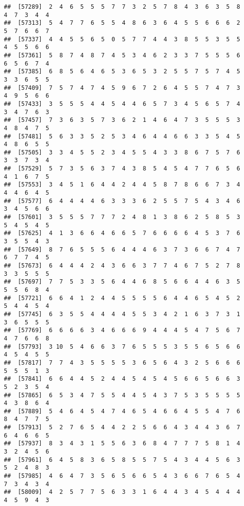 \documentclass[
]{book}
\begin{document}
\begin{verbatim}
##  [57289]  2  4  6  5  5  5  7  7  3  2  5  7  8  4  3  6  3  5  8  4  7  3  4  4
##  [57313]  5  4  7  7  6  5  5  4  8  6  3  6  4  5  5  6  6  6  2  5  7  6  6  7
##  [57337]  4  4  5  5  6  5  0  5  7  7  4  4  3  8  5  5  3  5  5  4  5  5  6  6
##  [57361]  5  8  7  4  8  7  4  5  3  4  6  2  3  3  7  5  5  5  6  6  5  6  7  4
##  [57385]  6  8  5  6  4  6  5  3  6  5  3  2  5  5  7  5  7  4  5  3  3  6  5  5
##  [57409]  7  5  7  4  7  4  5  9  6  7  2  6  4  5  5  7  4  7  3  4  9  5  6  6
##  [57433]  3  5  5  5  4  4  5  4  4  6  5  7  3  4  5  6  5  7  4  3  4  7  6  3
##  [57457]  7  3  6  3  5  7  3  6  2  1  4  6  4  7  3  5  5  5  3  4  8  4  7  5
##  [57481]  5  6  3  3  5  2  5  3  4  6  4  4  6  6  3  3  5  4  5  4  8  6  5  5
##  [57505]  3  3  4  5  5  2  3  4  5  5  4  3  3  8  6  7  5  7  6  3  3  7  3  4
##  [57529]  5  7  3  5  6  3  7  4  3  8  5  4  5  4  7  7  6  5  6  4  1  6  7  5
##  [57553]  3  4  5  1  6  4  4  2  4  4  5  8  7  8  6  6  7  3  4  4  4  6  4  5
##  [57577]  6  4  4  4  4  6  3  3  3  6  2  5  5  7  5  4  3  4  6  3  4  5  6  6
##  [57601]  3  5  5  5  7  7  7  2  4  8  1  3  8  6  2  5  8  5  3  5  4  5  4  5
##  [57625]  4  1  3  6  6  4  6  6  5  7  6  6  6  6  4  5  3  7  6  3  5  5  4  3
##  [57649]  8  7  6  5  5  5  6  4  4  4  6  3  7  3  6  6  7  4  7  6  7  7  4  5
##  [57673]  6  4  4  4  2  4  3  6  6  3  7  7  4  6  7  5  2  7  8  3  3  5  5  5
##  [57697]  7  7  5  3  3  5  6  4  4  6  8  5  6  6  4  4  6  3  5  5  5  6  8  4
##  [57721]  6  6  4  1  2  4  4  5  5  5  5  6  4  4  6  5  4  5  2  5  4  4  5  4
##  [57745]  6  3  5  5  4  4  4  4  5  5  3  4  2  1  6  3  7  3  1  3  6  5  5  5
##  [57769]  6  6  6  6  3  4  6  6  6  9  4  4  4  5  4  7  5  6  7  4  7  6  6  8
##  [57793]  3 10  5  4  6  6  3  7  6  5  5  5  3  5  5  6  5  6  6  4  5  4  5  5
##  [57817]  7  7  4  3  5  5  5  5  3  6  5  6  4  3  2  5  6  6  6  5  5  5  1  3
##  [57841]  6  6  4  4  5  2  4  4  5  4  5  4  5  6  6  5  6  6  3  5  2  3  5  4
##  [57865]  6  5  3  4  7  5  5  4  4  5  4  3  7  5  3  5  5  5  5  4  3  8  6  4
##  [57889]  5  4  6  4  5  4  7  4  6  5  4  6  6  4  5  5  4  7  6  8  4  7  7  5
##  [57913]  5  2  7  6  5  4  4  2  2  5  6  6  4  3  4  4  3  6  7  6  4  6  6  5
##  [57937]  8  3  4  3  1  5  5  6  3  6  8  4  7  7  7  5  8  1  4  3  2  4  5  6
##  [57961]  6  4  5  8  3  6  5  8  5  5  7  5  4  3  4  4  5  6  3  5  2  4  8  3
##  [57985]  4  6  4  7  3  5  6  5  6  6  5  4  3  6  6  7  6  5  4  7  3  4  3  4
##  [58009]  4  2  5  7  7  5  6  3  3  1  6  4  4  3  4  5  4  4  4  4  5  9  4  3

\end{verbatim}
\end{document}

